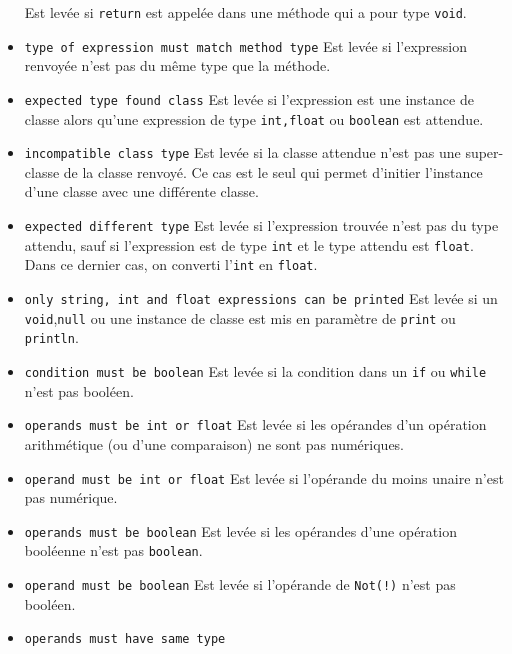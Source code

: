 \documentclass[a4paper, 10pt, french]{article}
\begin{document}
\begin{itemize}
Est levée si \texttt{return} est appelée dans une méthode qui a pour type \texttt{void}.
\item \texttt{type of expression must match method type}
\newline
Est levée si l'expression renvoyée n'est pas du même type que la méthode.
\item \texttt{expected type found class}
\newline
Est levée si l'expression est une instance de classe alors qu'une expression de type \texttt{int,float} ou \texttt{boolean} est attendue.
\item \texttt{incompatible class type}
\newline
Est levée si la classe attendue n'est pas une super-classe de la classe renvoyé. Ce cas est le seul qui permet d'initier l'instance d'une classe avec une différente classe.
\item \texttt{expected different type}
\newline
Est levée si l'expression trouvée n'est pas du type attendu, sauf si l'expression est de type \texttt{int} et le type attendu est \texttt{float}. Dans ce dernier cas, on converti l'\texttt{int} en \texttt{float}.
\item \texttt{only string, int and float expressions can be printed}
\newline
Est levée si un \texttt{void},\texttt{null} ou une instance de classe est mis en paramètre de \texttt{print} ou \texttt{println}.
\item \texttt{condition must be boolean}
\newline
Est levée si la condition dans un \texttt{if} ou \texttt{while} n'est pas booléen.
\item \texttt{operands must be int or float}
\newline
Est levée si les opérandes d'un opération arithmétique (ou d'une comparaison) ne sont pas numériques.
\item \texttt{operand must be int or float}
\newline
Est levée si l'opérande du moins unaire n'est pas numérique.
\item \texttt{operands must be boolean}
\newline
Est levée si les opérandes d'une opération booléenne n'est pas \texttt{boolean}.
\item \texttt{operand must be boolean}
\newline
Est levée si l'opérande de \texttt{Not(!)} n'est pas booléen.
\item \texttt{operands must have same type}

\end{itemize}
\end{document}
